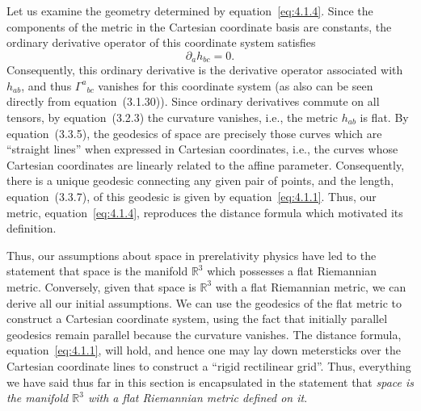 Let us examine the geometry determined by equation~\eqref{eq:4.1.4}. Since the
components of the metric in the Cartesian coordinate basis are constants, the
ordinary derivative operator of this coordinate system satisfies
\begin{equation}
  \partial_a h_{bc}=0 .
  \tag{4.1.5}\label{eq:4.1.5}
\end{equation}
Consequently, this ordinary derivative is the derivative operator associated with
\(h_{ab}\), and thus \(\Gamma^a{}_{bc}\) vanishes for this coordinate system
(as also can be seen directly from equation~(3.1.30)). Since ordinary derivatives
commute on all tensors, by equation~(3.2.3) the curvature vanishes, i.e., the
metric \(h_{ab}\) is flat. By equation~(3.3.5), the geodesics of space are
precisely those curves which are \textquotedblleft straight
lines\textquotedblright{} when expressed in Cartesian coordinates, i.e., the
curves whose Cartesian coordinates are linearly related to the affine parameter.
Consequently, there is a unique geodesic connecting any given pair of points, and
the length, equation~(3.3.7), of this geodesic is given by
equation~\eqref{eq:4.1.1}. Thus, our metric, equation~\eqref{eq:4.1.4},
reproduces the distance formula which motivated its definition.

Thus, our assumptions about space in prerelativity physics have led to the
statement that space is the manifold \(\mathbb R^3\) which possesses a flat
Riemannian metric. Conversely, given that space is \(\mathbb R^3\) with a flat
Riemannian metric, we can derive all our initial assumptions. We can use the
geodesics of the flat metric to construct a Cartesian coordinate system, using the
fact that initially parallel geodesics remain parallel because the curvature
vanishes. The distance formula, equation~\eqref{eq:4.1.1}, will hold, and hence
one may lay down metersticks over the Cartesian coordinate lines to construct a
\textquotedblleft rigid rectilinear grid\textquotedblright. Thus, everything we
have said thus far in this section is encapsulated in the statement that
\emph{space is the manifold \(\mathbb R^3\) with a flat Riemannian metric
defined on it}.

